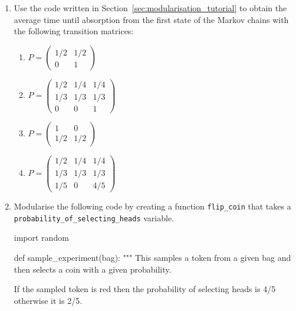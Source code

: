 \begin{enumerate}

\item 

Use the code written in Section~\ref{sec:modularisation_tutorial} to obtain the average time
until absorption from the first state of the Markov chains with the following transition 
matrices:
\begin{enumerate}

\item 

\(P = \begin{pmatrix}1/2 & 1/2 \\ 0 & 1 \end{pmatrix}\)

\item 

\(P = \begin{pmatrix}1/2 & 1/4 & 1/4\\ 1/3 & 1/3 & 1/3  \\0 & 0 & 1 \end{pmatrix}\)

\item 

\(P = \begin{pmatrix}1 & 0 \\ 1/2 & 1/2 \end{pmatrix}\)

\item 

\(P = \begin{pmatrix}1/2 & 1/4 & 1/4\\ 1/3 & 1/3 & 1/3  \\1/5 & 0 & 4/5 \end{pmatrix}\)

\end{enumerate}

\item 

Modularise the following code by creating a function \texttt{flip\_coin} that takes a
\texttt{probability\_of\_selecting\_heads} variable.

\begin{pyin}
import random

def sample_experiment(bag):
    """
    This samples a token from a given bag and then
    selects a coin with a given probability.

    If the sampled token is red then the probability
    of selecting heads is 4/5 otherwise it is 2/5.


\end{pyin}
\end{enumerate}
